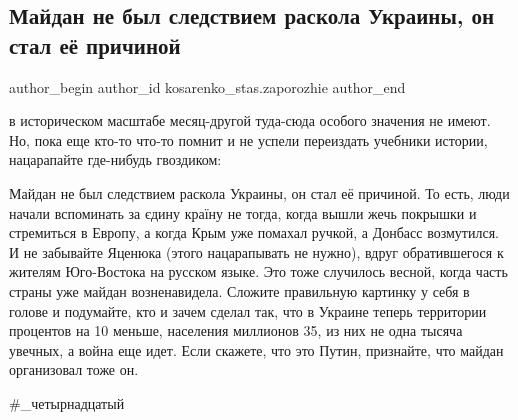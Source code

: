  
 
 
 
 
 
\subsection{Майдан не был следствием раскола Украины, он стал её причиной}
\label{sec:23_11_2020.fb.kosarenko_stas.zaporozhie.1.maidan}
 
\ifcmt
 author_begin
   author_id kosarenko_stas.zaporozhie
 author_end
\fi

в историческом масштабе месяц-другой туда-сюда особого значения не имеют. Но,
пока еще кто-то что-то помнит и не успели переиздать учебники истории,
нацарапайте где-нибудь гвоздиком:

Майдан не был следствием раскола Украины, он стал её причиной. То есть, люди
начали вспоминать за єдину країну не тогда, когда вышли жечь покрышки и
стремиться в Европу, а когда Крым уже помахал ручкой, а Донбасс возмутился. И
не забывайте Яценюка (этого нацарапывать не нужно), вдруг обратившегося к
жителям Юго-Востока на русском языке. Это тоже случилось весной, когда часть
страны уже майдан возненавидела. Сложите правильную картинку у себя в голове и
подумайте, кто и зачем сделал так, что в Украине теперь территории процентов на
10 меньше, населения миллионов 35, из них не одна тысяча увечных, а война еще
идет. Если скажете, что это Путин, признайте, что майдан организовал тоже он.

\#\_четырнадцатый

